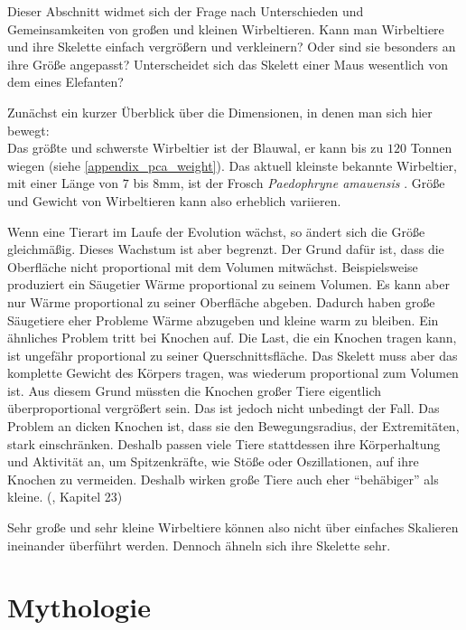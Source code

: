 Dieser Abschnitt widmet sich der Frage nach Unterschieden und Gemeinsamkeiten von großen und kleinen Wirbeltieren. Kann man Wirbeltiere und ihre Skelette einfach vergrößern und verkleinern? Oder sind sie besonders an ihre Größe angepasst? Unterscheidet sich das Skelett einer Maus wesentlich von dem eines Elefanten?

Zunächst ein kurzer Überblick über die Dimensionen, in denen man sich hier bewegt:\\
Das größte und schwerste Wirbeltier ist der Blauwal, er kann bis zu $120$ Tonnen wiegen (siehe \ref{appendix_pca_weight}). Das aktuell kleinste bekannte Wirbeltier, mit einer Länge von $7$ bis $8$mm, ist der Frosch \emph{Paedophryne amauensis} \cite{smallestVertebrate}. Größe und Gewicht von Wirbeltieren kann also erheblich variieren.

Wenn eine Tierart im Laufe der Evolution wächst, so ändert sich die Größe gleichmäßig. Dieses Wachstum ist aber begrenzt. Der Grund dafür ist, dass die Oberfläche nicht proportional mit dem Volumen mitwächst. Beispielsweise produziert ein Säugetier Wärme proportional zu seinem Volumen. Es kann aber nur Wärme proportional zu seiner Oberfläche abgeben. Dadurch haben große Säugetiere eher Probleme Wärme abzugeben und kleine warm zu bleiben.
Ein ähnliches Problem tritt bei Knochen auf. Die Last, die ein Knochen tragen kann, ist ungefähr proportional zu seiner Querschnittsfläche. Das Skelett muss aber das komplette Gewicht des Körpers tragen, was wiederum proportional zum Volumen ist.
Aus diesem Grund müssten die Knochen großer Tiere eigentlich überproportional vergrößert sein. Das ist jedoch nicht unbedingt der Fall. Das Problem an dicken Knochen ist, dass sie den Bewegungsradius, \zb der Extremitäten, stark einschränken. Deshalb passen viele Tiere stattdessen ihre Körperhaltung und Aktivität an, um Spitzenkräfte, wie Stöße oder Oszillationen, auf ihre Knochen zu vermeiden. Deshalb wirken große Tiere auch eher "`behäbiger"' als kleine. (\cite{Vergleichende_Anatomie}, Kapitel 23)

Sehr große und sehr kleine Wirbeltiere können also nicht über einfaches Skalieren ineinander überführt werden. Dennoch ähneln sich ihre Skelette sehr.


\section{Mythologie}
\label{biology_mythology}

